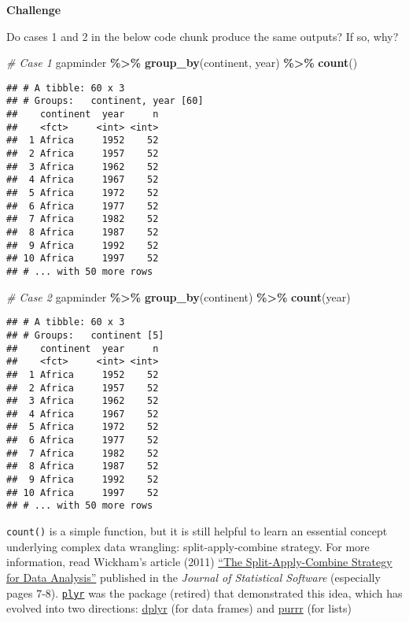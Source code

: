 \documentclass[
]{book}
\newenvironment{Shaded}{\begin{snugshade}}{\end{snugshade}}
\newcommand{\CommentTok}[1]{\textcolor[rgb]{0.56,0.35,0.01}{\textit{#1}}}
\newcommand{\KeywordTok}[1]{\textcolor[rgb]{0.13,0.29,0.53}{\textbf{#1}}}
\newcommand{\NormalTok}[1]{#1}
\newcommand{\OperatorTok}[1]{\textcolor[rgb]{0.81,0.36,0.00}{\textbf{#1}}}
\newcommand{\StringTok}[1]{\textcolor[rgb]{0.31,0.60,0.02}{#1}}
\begin{document}
\textbf{Challenge}

Do cases 1 and 2 in the below code chunk produce the same outputs? If so, why?

\begin{Shaded}
\begin{Highlighting}[]
\CommentTok{\# Case 1}
\NormalTok{gapminder }\OperatorTok{\%\textgreater{}\%}
\StringTok{  }\KeywordTok{group\_by}\NormalTok{(continent, year) }\OperatorTok{\%\textgreater{}\%}
\StringTok{  }\KeywordTok{count}\NormalTok{()}
\end{Highlighting}
\end{Shaded}

\begin{verbatim}
## # A tibble: 60 x 3
## # Groups:   continent, year [60]
##    continent  year     n
##    <fct>     <int> <int>
##  1 Africa     1952    52
##  2 Africa     1957    52
##  3 Africa     1962    52
##  4 Africa     1967    52
##  5 Africa     1972    52
##  6 Africa     1977    52
##  7 Africa     1982    52
##  8 Africa     1987    52
##  9 Africa     1992    52
## 10 Africa     1997    52
## # ... with 50 more rows
\end{verbatim}

\begin{Shaded}
\begin{Highlighting}[]
\CommentTok{\# Case 2}
\NormalTok{gapminder }\OperatorTok{\%\textgreater{}\%}
\StringTok{  }\KeywordTok{group\_by}\NormalTok{(continent) }\OperatorTok{\%\textgreater{}\%}
\StringTok{  }\KeywordTok{count}\NormalTok{(year)}
\end{Highlighting}
\end{Shaded}

\begin{verbatim}
## # A tibble: 60 x 3
## # Groups:   continent [5]
##    continent  year     n
##    <fct>     <int> <int>
##  1 Africa     1952    52
##  2 Africa     1957    52
##  3 Africa     1962    52
##  4 Africa     1967    52
##  5 Africa     1972    52
##  6 Africa     1977    52
##  7 Africa     1982    52
##  8 Africa     1987    52
##  9 Africa     1992    52
## 10 Africa     1997    52
## # ... with 50 more rows
\end{verbatim}

\texttt{count()} is a simple function, but it is still helpful to learn an essential concept underlying complex data wrangling: split-apply-combine strategy. For more information, read Wickham's article (2011) \href{http://citeseerx.ist.psu.edu/viewdoc/download?doi=10.1.1.182.5667\&rep=rep1\&type=pdf}{``The Split-Apply-Combine Strategy for Data Analysis''} published in the \emph{Journal of Statistical Software} (especially pages 7-8). \href{https://github.com/hadley/plyr}{\texttt{plyr}} was the package (retired) that demonstrated this idea, which has evolved into two directions: \href{https://dplyr.tidyverse.org/}{dplyr} (for data frames) and \href{https://purrr.tidyverse.org/}{purrr} (for lists)
\end{document}
